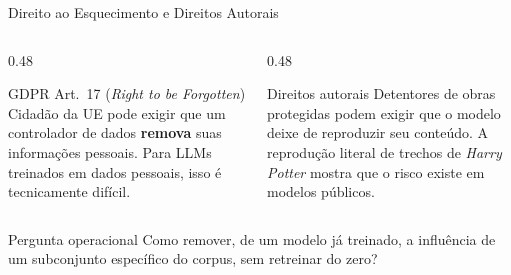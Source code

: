 \documentclass[aspectratio=169,xcolor=dvipsnames]{beamer}
\begin{document}
  \begin{frame}{Direito ao Esquecimento e Direitos Autorais}
    \begin{columns}[T]
      \begin{column}{0.48\textwidth}
        \begin{block}{GDPR Art.\ 17 (\textit{Right to be Forgotten})}
          Cidadão da UE pode exigir que um controlador de dados \textbf{remova} suas informações pessoais. Para LLMs treinados em dados pessoais, isso é tecnicamente difícil.
        \end{block}
      \end{column}
      \begin{column}{0.48\textwidth}
        \begin{alertblock}{Direitos autorais}
          Detentores de obras protegidas podem exigir que o modelo deixe de reproduzir seu conteúdo. A reprodução literal de trechos de \textit{Harry Potter} mostra que o risco existe em modelos públicos.
        \end{alertblock}
      \end{column}
    \end{columns}

    \vspace{0.5em}
    \begin{block}{Pergunta operacional}
      Como remover, de um modelo já treinado, a influência de um subconjunto específico do corpus, sem retreinar do zero?
    \end{block}
  \end{frame}
\end{document}
